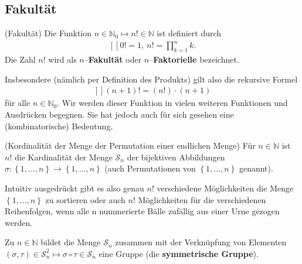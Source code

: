 \documentclass[../Analysis1_script.tex]{subfiles}
\begin{document}
\subsection{Fakultät}

\begin{definition}{(Fakultät)}
	Die Funktion $n \in \mathbb {N}_0 \mapsto n! \in \mathbb {N}$ ist definiert durch
	\[\begin{aligned}[]
		0! = 1,\ n! = \prod _{k=1}^n k.
	\end{aligned}\]
Die Zahl $n!$ wird als $n$–\textbf{Fakultät} oder $n$–\textbf{Faktorielle} bezeichnet. 
\end{definition}

Insbesondere (nämlich per Definition des Produkts) gilt also die rekursive Formel
\[\begin{aligned}[]
	(n+1)! = (n!)\cdot (n+1)
\end{aligned}\]
für alle $n\in \mathbb {N}_0$. Wir werden dieser Funktion in vielen weiteren Funktionen und Ausdrücken begegnen. Sie hat jedoch auch für sich gesehen eine (kombinatorische) Bedeutung.

\begin{lemma}{(Kordinalität der Menge der Permutation einer endlichen Menge)}
	Für $n\in \mathbb {N}$ ist $n!$ die Kardinalität der Menge $\mathcal {S}_n$ der bijektiven Abbildungen $\sigma :\left \lbrace {1,\ldots ,n} \right \rbrace \to \left \lbrace {1,\ldots ,n} \right \rbrace$ (auch Permutationen von $\left \lbrace {1,\ldots ,n} \right \rbrace$ genannt). 
\end{lemma}

Intuitiv ausgedrückt gibt es also genau $n!$ verschiedene Möglichkeiten die Menge $\left \lbrace {1,\ldots ,n} \right \rbrace$ zu sortieren oder auch $n!$ Möglichkeiten für die verschiedenen Reihenfolgen, wenn alle n nummerierte Bälle zufällig aus einer Urne gezogen werden.

\begin{remark}
	Zu $n\in \mathbb {N}$ bildet die Menge $\mathcal {S}_n$ zusammen mit der Verknüpfung von Elementen $(\sigma ,\tau )\in \mathcal {S}_n^2 \mapsto \sigma \circ \tau \in \mathcal {S}_n$ eine Gruppe (die \textbf{symmetrische Gruppe}). 
\end{remark}
\end{document}
